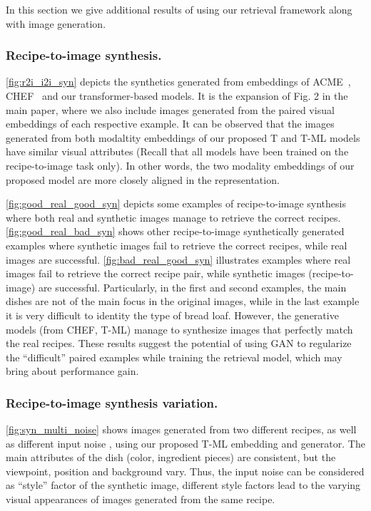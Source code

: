 \documentclass[sigconf,nonacm]{acmart}
\begin{document}
\begin{multicols}{2}
In this section we give additional results of using our retrieval framework along with image generation.

\subsubsection*{\textbf{Recipe-to-image synthesis}.}
\autoref{fig:r2i_i2i_syn} depicts the synthetics generated from embeddings of ACME~\cite{wang2019}, CHEF~\cite{chef2021} and our transformer-based models. It is the expansion of Fig. 2 in the main paper, where we also include images generated from the paired visual embeddings of each respective example. It can be observed that the images generated from both modaltity embeddings of our proposed T and T-ML models have similar visual attributes (Recall that all models have been trained on the recipe-to-image task only). In other words, the two modality embeddings of our proposed model are more closely aligned in the representation.

\autoref{fig:good_real_good_syn} depicts some examples of recipe-to-image synthesis where both real and synthetic images manage to retrieve the correct recipes. \autoref{fig:good_real_bad_syn} shows other recipe-to-image synthetically generated examples where synthetic images fail to retrieve the correct recipes, while real images are successful. \autoref{fig:bad_real_good_syn} illustrates examples where real images fail to retrieve the correct recipe pair, while synthetic images (recipe-to-image) are successful. Particularly, in the first and second examples, the main dishes are not of the main focus in the original images, while in the last example it is very difficult to identity the type of bread loaf. However, the generative models (from CHEF, T-ML) manage to synthesize images that perfectly match the real recipes. These results suggest the potential of using GAN to regularize the ``difficult'' paired examples while training the retrieval model, which may bring about performance gain.



\subsubsection*{\textbf{Recipe-to-image synthesis variation.}}
\autoref{fig:syn_multi_noise} shows images generated from two different recipes, as well as different input noise , using our proposed T-ML embedding and generator. The main attributes of the dish (color, ingredient pieces) are consistent, but the viewpoint, position and background vary. Thus, the input noise can be considered as ``style'' factor of the synthetic image,  different style factors lead to the varying visual appearances of images generated from the same recipe.










\end{multicols}
\end{document}
